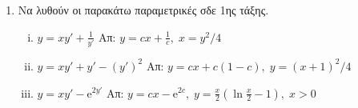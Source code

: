 


\pagestyle{askhseis}





\begin{center}
\end{center}

\vspace{\baselineskip}

\begin{enumerate}[wide,labelwidth=!,labelindent=0pt]
  \item Να λυθούν οι παρακάτω παραμετρικές σδε 1ης τάξης.
    \begin{enumerate}[i)]
      \item $ y = xy' + \frac{1}{y'} $ \hfill Απ: $ y=cx+ \frac{1}{c}, \; x = y^{2}/4 $ 
      \item $ y = xy' + y' - (y')^{2} $ \hfill Απ: $ y=cx+c(1-c), \; y= (x+1)^{2}/4 $ 
      \item $ y=xy'- \mathrm{e}^{2y'} $ \hfill Απ: $ y=cx- \mathrm{e}^{2c}, \; y =
        \frac{x}{2} (\ln{\frac{x}{2}} -1), \; x>0 $ 
    \end{enumerate}
    
\end{enumerate}





